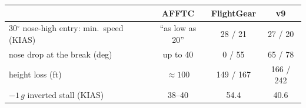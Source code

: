 \begin{tabular}{lccc}
\toprule
 & AFFTC & FlightGear & v9 \\
\midrule
30$^\circ$ nose-high entry: min.\ speed (KIAS) & ``as low as 20'' & 28 / 21 & 27 / 20 \\
\quad nose drop at the break (deg) & up to 40 & 0 / 55 & 65 / 78 \\
\quad height loss (ft) & $\approx 100$ & 149 / 167 & 166 / 242 \\
$-1\,g$ inverted stall (KIAS) & 38--40 & 54.4 & 40.6 \\
\bottomrule
\end{tabular}
